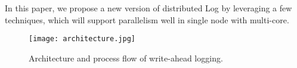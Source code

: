 In this paper, we propose a new version of distributed Log by leveraging a few techniques, which will support parallelism well in single node with multi-core.

\begin{figure}[htbp]
  \centering
  \texttt{[image: architecture.jpg]}\\
  \caption{Architecture and process flow of write-ahead logging.}\label{fig:architecture}
\end{figure}


